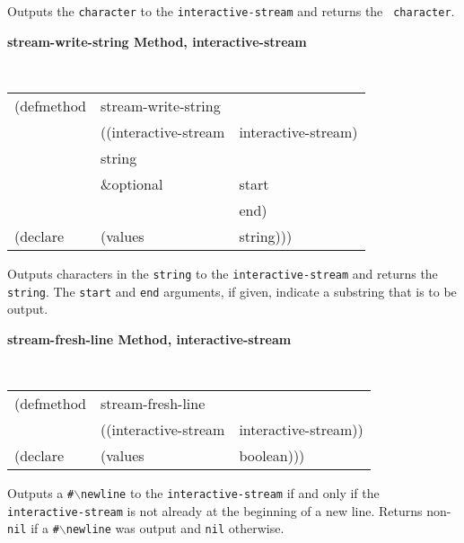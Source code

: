 \documentclass[twoside]{book}
\begin{document}
\begin{sloppy}
{\begin{flushright}
{}\end{flushright}}

\begin{flushright} \parbox[t]{6.125in}{
Outputs the {\tt character} to the {\tt interactive-stream} and returns the {\tt
character}.
 
}
\end{flushright}

{\samepage
{\large {\bf stream-write-string \hfill Method, interactive-stream}}
\begin{flushright} \parbox[t]{6.125in}{
\tt
\begin{tabular}{lll}
\raggedright
(defmethod & stream-write-string & \\
& ((interactive-stream  &interactive-stream)\\
& string\\
& \&optional & start \\
&            & end)\\
(declare &(values &string)))
\end{tabular}
\rm

}\end{flushright}}

\begin{flushright} \parbox[t]{6.125in}{
Outputs characters in the {\tt string} to the {\tt interactive-stream} and returns
the {\tt string}. The {\tt start} and {\tt end} arguments, if given, indicate a
substring that is to be output.
 
}
\end{flushright}

{\samepage
{\large {\bf stream-fresh-line \hfill Method, interactive-stream}}
\begin{flushright} \parbox[t]{6.125in}{
\tt
\begin{tabular}{lll}
\raggedright
(defmethod & stream-fresh-line & \\
& ((interactive-stream  &interactive-stream))\\
(declare &(values &boolean)))
\end{tabular}
\rm

}\end{flushright}}

\begin{flushright} \parbox[t]{6.125in}{
Outputs a {\tt \#$\backslash$newline} to the {\tt interactive-stream} if and only if
the {\tt interactive-stream} is not already at the beginning of a new line. Returns non-{\tt
nil} if a {\tt \#$\backslash$newline} was output and {\tt nil} otherwise.
 
}
\end{flushright}
\end{sloppy}
\end{document}
